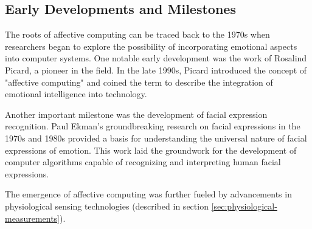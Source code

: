 \subsection{Early Developments and Milestones}
The roots of affective computing can be traced back to the 1970s when researchers began to explore the possibility of incorporating emotional aspects into computer systems. 
One notable early development was the work of Rosalind Picard, a pioneer in the field.
In the late 1990s, Picard introduced the concept of "affective computing" and coined the term to describe the integration of emotional intelligence into technology.

Another important milestone was the development of facial expression recognition.
Paul Ekman's groundbreaking research on facial expressions in the 1970s and 1980s provided a basis for understanding the universal nature of facial expressions of emotion. 
This work laid the groundwork for the development of computer algorithms capable of recognizing and interpreting human facial expressions.

The emergence of affective computing was further fueled by advancements in physiological sensing technologies (described in section \ref{sec:physiological-measurements}).